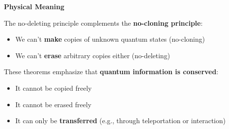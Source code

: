 \highspace
\begin{flushleft}
    \textcolor{Green3}{ \textbf{Physical Meaning}}
\end{flushleft}
The no-deleting principle complements the \textbf{no-cloning principle}:
\begin{itemize}
    \item We can't \textbf{make} copies of unknown quantum states (no-cloning)
    \item We can't \textbf{erase} arbitrary copies either (no-deleting)
\end{itemize}
These theorems emphasize that \textbf{quantum information is conserved}:
\begin{itemize}
    \item It cannot be copied freely
    \item It cannot be erased freely
    \item It can only be \textbf{transferred} (e.g., through teleportation or interaction)
\end{itemize}